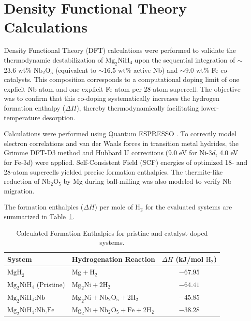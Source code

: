 \documentclass[12pt,a4paper]{article}
\begin{document}
\section{Density Functional Theory Calculations}

Density Functional Theory (DFT) calculations were performed to validate the thermodynamic destabilization of $\text{Mg}_2\text{NiH}_4$ upon the sequential integration of $\sim$23.6 wt\% $\text{Nb}_2\text{O}_5$ (equivalent to $\sim$16.5 wt\% active Nb) and $\sim$9.0 wt\% Fe co-catalysts. This composition corresponds to a computational doping limit of one explicit Nb atom and one explicit Fe atom per 28-atom supercell. The objective was to confirm that this co-doping systematically increases the hydrogen formation enthalpy ($\Delta H$), thereby thermodynamically facilitating lower-temperature desorption.

Calculations were performed using Quantum ESPRESSO \cite{giannozzi2009quantum}. To correctly model electron correlations and van der Waals forces in transition metal hydrides, the Grimme DFT-D3 method \cite{grimme2010consistent} and Hubbard U corrections (9.0 eV for Ni-$3d$, 4.0 eV for Fe-$3d$) \cite{cococcioni2005linear} were applied. Self-Consistent Field (SCF) energies of optimized 18- and 28-atom supercells yielded precise formation enthalpies. The thermite-like reduction of $\text{Nb}_2\text{O}_5$ by Mg during ball-milling was also modeled to verify Nb migration.

The formation enthalpies ($\Delta H$) per mole of $\text{H}_2$ for the evaluated systems are summarized in Table~\ref{tab:enthalpies}.

\begin{table}[h]
    \centering
    \caption{Calculated Formation Enthalpies for pristine and catalyst-doped systems.}
    \vspace{0.2cm}
    \begin{tabular}{llc}
        \toprule
        \textbf{System} & \textbf{Hydrogenation Reaction} & \textbf{$\Delta H$ (kJ/mol $\text{H}_2$)} \\
        \midrule
        $\text{MgH}_2$ & $\text{Mg} + \text{H}_2$ & $-67.95$ \\
        $\text{Mg}_2\text{NiH}_4$ (Pristine) & $\text{Mg}_2\text{Ni} + 2\text{H}_2$ & $-64.41$ \\
        $\text{Mg}_2\text{NiH}_4\text{:Nb}$ & $\text{Mg}_2\text{Ni} + \text{Nb}_2\text{O}_5 + 2\text{H}_2$ & $-45.85$ \\
        $\text{Mg}_2\text{NiH}_4\text{:Nb,Fe}$ & $\text{Mg}_2\text{Ni} + \text{Nb}_2\text{O}_5 + \text{Fe} + 2\text{H}_2$ & $-38.28$ \\
        \bottomrule
    \end{tabular}
    \label{tab:enthalpies}
\end{table}
\end{document}
